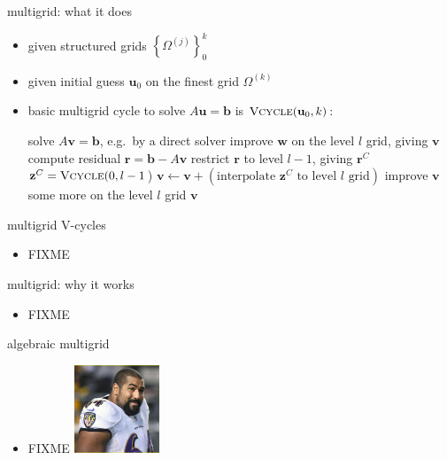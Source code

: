 \documentclass[hide notes,intlimits,usenames,dvipsnames]{beamer}
\newcommand{\bb}{\mathbf{b}}
\newcommand{\br}{\mathbf{r}}
\newcommand{\bu}{\mathbf{u}}
\newcommand{\bv}{\mathbf{v}}
\newcommand{\bw}{\mathbf{w}}
\newcommand{\bz}{\mathbf{z}}
\begin{document}
\begin{frame}{multigrid: what it does}

\small
\begin{itemize}
\item given structured grids $\left\{\Omega^{(j)}\right\}_0^k$
\item given initial guess $\bu_0$ on the finest grid $\Omega^{(k)}$
\item basic multigrid cycle to solve $A \bu = \bb$ is $\text{\textsc{Vcycle}}(\bu_0,k)$:

\medskip
\begin{algorithmic}
\footnotesize
\Function{Vcycle}{$\bw,l$}
        \State solve $A \bv = \bb$, e.g.~by a direct solver
    \Else
        \State improve $\bw$ on the level $l$ grid, giving $\bv$
        \State compute residual $\br = \bb - A \bv$
        \State restrict $\br$ to level $l-1$, giving $\br^C$
        \State $\bz^C = \text{\textsc{Vcycle}}(0,l-1$)
        \State $\bv \gets \bv + (\text{interpolate } \bz^C \text{ to level $l$ grid})$
        \State improve $\bv$ some more on the level $l$ grid
        \EndIf
    \Return $\bv$
\EndFunction
\end{algorithmic}
\end{itemize}
\end{frame}


\begin{frame}{multigrid V-cycles}

\begin{itemize}
\item FIXME
\end{itemize}




\medskip
\qquad 
\end{frame}


\begin{frame}{multigrid: why it works}
\begin{itemize}
\item FIXME
\end{itemize}
\end{frame}


\begin{frame}{algebraic multigrid}
\begin{itemize}
\item FIXME   \includegraphics[width=0.2\textwidth]{figs/urschel}
\end{itemize}
\end{frame}
\end{document}
